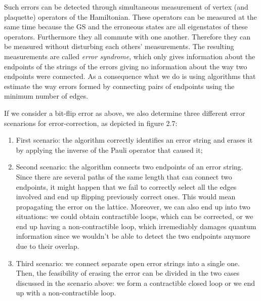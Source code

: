 \documentclass{Configuration_Files/PoliMi3i_thesis}
\begin{document}
Such errors can be detected through  simultaneous measurement of vertex (and plaquette) operators of the Hamiltonian. These operators can be measured at the same time because the GS and the erroneous states are all eigenstates of these operators. Furthermore they all commute with one another. Therefore they can be measured without disturbing each others' measurements. The resulting measurements are called {\it error syndrome}, which only gives information about the endpoints of the strings of the errors giving no information about the way two endpoints were connected. As a consequence what we do is using algorithms that estimate the way errors formed by connecting pairs of endpoints using the minimum number of edges. \newline

If we consider a bit-flip error as above, we also determine three different error scenarions for error-correction, as depicted in figure 2.7: 

\begin{enumerate}
	\item First scenario: the algorithm correctly identifies an error string and erases it by applying the inverse of the Pauli operator that caused it;
	
	\item Second scenario: the algorithm connects two endpoints of an error string. Since there are several paths of the same length that can connect two endpoints, it might happen that we fail to correctly select all the edges involved and end up flipping previously correct ones. This would mean propagating the error on the lattice. \newline 
	Moreover, we can also end up into two situations: we could obtain contractible loops, which can be corrected, or we end up having a non-contractible loop, which irremediably damages quantum information since we wouldn't be able to detect the two endpoints anymore due to their overlap.
	
	\item Third scenario: we connect separate open error strings into a single one. Then, the feasibility of erasing the error can be divided in the two cases discussed in the scenario above: we form a contractible closed loop or we end up with a non-contractible loop. 
	
\end{enumerate}
\end{document}
